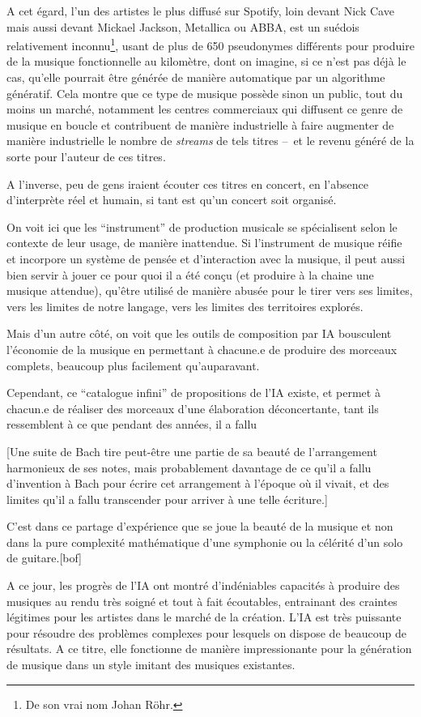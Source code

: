 A cet égard, l'un des artistes le plus diffusé sur Spotify, loin devant Nick Cave mais aussi devant Mickael Jackson, Metallica ou ABBA, est un suédois relativement inconnu\footnote{De son vrai nom Johan Röhr.}, usant de plus de 650 pseudonymes différents pour produire de la musique fonctionnelle au kilomètre, dont on imagine, si ce n'est pas déjà le cas, qu'elle pourrait être générée de manière automatique par un algorithme génératif. Cela montre que ce type de musique possède sinon un public, tout du moins un marché, notamment les centres commerciaux qui diffusent ce genre de musique en boucle et contribuent de manière industrielle à faire augmenter de manière industrielle le nombre de \textit{streams} de tels titres --~et le revenu généré de la sorte pour l'auteur de ces titres.

A l'inverse, peu de gens iraient écouter ces titres en concert, en l'absence d'interprète réel et humain, si tant est qu'un concert soit organisé.

On voit ici que les ``instrument'' de production musicale se spécialisent selon le contexte de leur usage, de manière inattendue.
Si l'instrument de musique réifie et incorpore un système de pensée et d'interaction avec la musique, il peut aussi bien servir à jouer ce pour quoi il a été conçu (et produire à la chaine une musique attendue), qu'être utilisé de manière abusée pour le tirer vers ses limites, vers les limites de notre langage, vers les limites des territoires explorés.

Mais d'un autre côté, on voit que les outils de composition par IA bousculent l'économie de la musique en permettant à chacune.e de produire des morceaux complets, beaucoup plus facilement qu'auparavant.

Cependant, ce ``catalogue infini'' de propositions de l'IA existe, et permet à chacun.e de réaliser des morceaux d'une élaboration déconcertante, tant ils ressemblent à ce que pendant des années, il a fallu 

[Une suite de Bach tire peut-être une partie de sa beauté de l'arrangement harmonieux de ses notes, mais probablement davantage de ce qu'il a fallu d'invention à Bach pour écrire cet arrangement à l'époque où il vivait, et des limites qu'il a fallu transcender pour arriver à une telle écriture.]

C'est dans ce partage d'expérience que se joue la beauté de la musique et non dans la pure complexité mathématique d'une symphonie ou la célérité d'un solo de guitare.[bof]

A ce jour, les progrès de l'IA ont montré d'indéniables capacités à produire des musiques au rendu très soigné et tout à fait écoutables, entrainant des craintes légitimes pour les artistes dans le marché de la création. 
L'IA est très puissante pour résoudre des problèmes complexes pour lesquels on dispose de beaucoup de résultats. A ce titre, elle fonctionne de manière impressionante pour la génération de musique dans un style imitant des musiques existantes.

